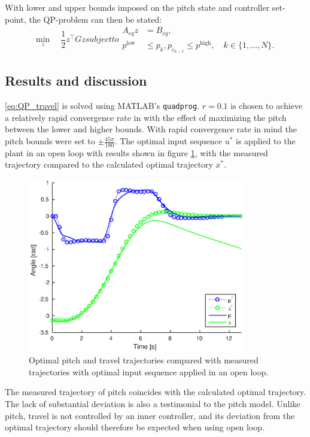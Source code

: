 With lower and upper bounds imposed on the pitch state and controller set-point, the QP-problem can then be stated:
\begin{subequations}
\label{eq:QP_travel}
\begin{equation}
	\min_z \quad \frac{1}{2} z^\top G z
\end{equation}
	subject to
\begin{align}
	A_{eq} z &= B_{eq}, \\
	p^{\textrm{low}} &\le p_k,p_{c_{k-1}} \le p^{\textrm{high}}, \quad k \in \{1, \dots, N\}.
\end{align}
\end{subequations}

\subsection{Results and discussion}
\eqref{eq:QP_travel} is solved using MATLAB's \texttt{quadprog}. $r = 0.1$ is chosen to achieve a relatively rapid convergence rate in with the effect of maximizing the pitch between the lower and higher bounds. With rapid convergence rate in mind the pitch bounds were set to $\pm\frac{45 \pi}{180}$. The optimal input sequence $u^*$ is applied to the plant in an open loop with results shown in figure \ref{fig:opt_openloop}, with the measured trajectory compared to the calculated optimal trajectory $x^*$.

\begin{figure}[hp]
	\centering
		\includegraphics[width=0.85\textwidth]{figures/2/openloop.eps}
	\caption{Optimal pitch and travel trajectories compared with measured trajectories with optimal input sequence applied in an open loop.}
	\label{fig:opt_openloop}
\end{figure}

The measured trajectory of pitch coincides with the calculated optimal trajectory. The lack of substantial deviation is also a testimonial to the pitch model. Unlike pitch, travel is not controlled by an inner controller, and its deviation from the optimal trajectory should therefore be expected when using open loop.

